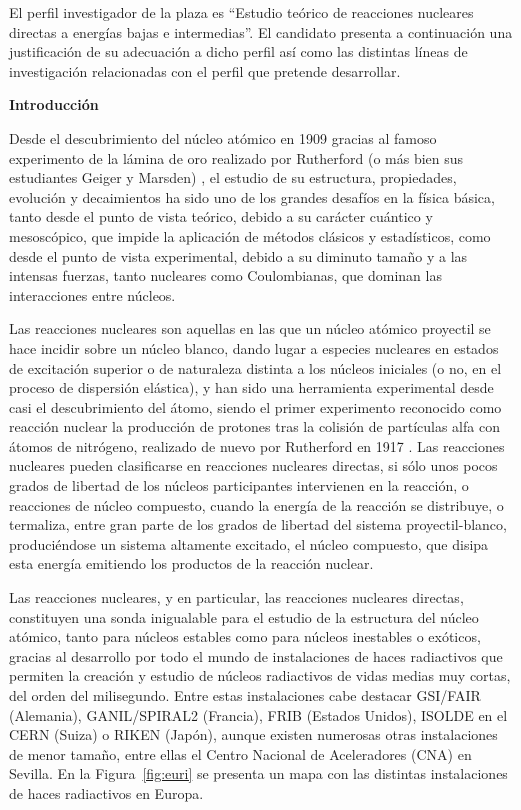 \documentclass[a4paper,12pt,twoside]{article}
\begin{document}
El perfil investigador de la plaza es ``Estudio teórico de
reacciones nucleares directas a energías bajas e intermedias''. El candidato presenta a continuación una justificación de su adecuación a dicho perfil así como las distintas líneas de investigación relacionadas con el perfil que pretende desarrollar.

\textbf{Introducción}

Desde el descubrimiento del núcleo atómico en 1909 gracias al famoso experimento de la lámina de oro realizado por Rutherford (o más bien sus estudiantes Geiger y Marsden) \cite{Rut09}, el estudio de su estructura, propiedades, evolución y decaimientos ha sido uno de los grandes desafíos en la física básica, tanto desde el punto de vista teórico, debido a su carácter cuántico y mesoscópico, que impide la aplicación de métodos clásicos y estadísticos, como desde el punto de vista experimental, debido a su diminuto tamaño y a las intensas fuerzas, tanto nucleares como Coulombianas, que dominan las interacciones entre núcleos.

Las reacciones nucleares son aquellas en las que un núcleo atómico proyectil se hace incidir sobre un núcleo blanco, dando lugar a especies nucleares en estados de excitación superior o de naturaleza distinta a los núcleos iniciales (o no, en el proceso de dispersión elástica), y han sido una herramienta experimental desde casi el descubrimiento del átomo, siendo el primer experimento reconocido como reacción nuclear la producción de protones tras la colisión de partículas alfa con átomos de nitrógeno, realizado de nuevo por Rutherford en 1917 \cite{Rut19}. Las reacciones nucleares pueden clasificarse en reacciones nucleares directas, si sólo unos pocos grados de libertad de los núcleos participantes intervienen en la reacción, o reacciones de núcleo compuesto, cuando la energía de la reacción se distribuye, o termaliza, entre gran parte de los grados de libertad del sistema proyectil-blanco, produciéndose un sistema altamente excitado, el núcleo compuesto, que disipa esta energía emitiendo los productos de la reacción nuclear.

Las reacciones nucleares, y en particular, las reacciones nucleares directas, constituyen una sonda inigualable para el estudio de la estructura del núcleo atómico, tanto para núcleos estables como para núcleos inestables o exóticos, gracias al desarrollo por todo el mundo de instalaciones de haces radiactivos que permiten la creación y estudio de núcleos radiactivos de vidas medias muy cortas, del orden del milisegundo. Entre estas instalaciones cabe destacar GSI/FAIR (Alemania), GANIL/SPIRAL2 (Francia), FRIB (Estados Unidos), ISOLDE en el CERN (Suiza) o RIKEN (Japón), aunque existen numerosas otras instalaciones de menor tamaño, entre ellas el Centro Nacional de Aceleradores (CNA) en Sevilla. En la Figura~\ref{fig:euri} se presenta un mapa con las distintas instalaciones de haces radiactivos en Europa.
\end{document}
